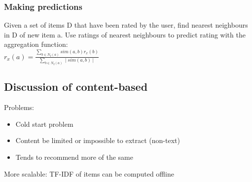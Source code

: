 \subsubsection{Making predictions}

Given a set of items D that have been rated by the user, find nearest
neighbours in D of new item a. Use ratings of nearest neighbours to
predict rating with the aggregation function: \\
$ r_x(a) = \frac{\sum_{b \in N_I(a)} sim(a, b) r_x(b)}{\sum_{b \in
    N_I(a)} \mid sim(a, b) \mid} $

\subsection{Discussion of content-based}
Problems:
\begin{itemize}
\item Cold start problem
\item Content be limited or impossible to extract (non-text)
\item Tends to recommend more of the same
\end{itemize}

More scalable: TF-IDF of items can be computed offline


